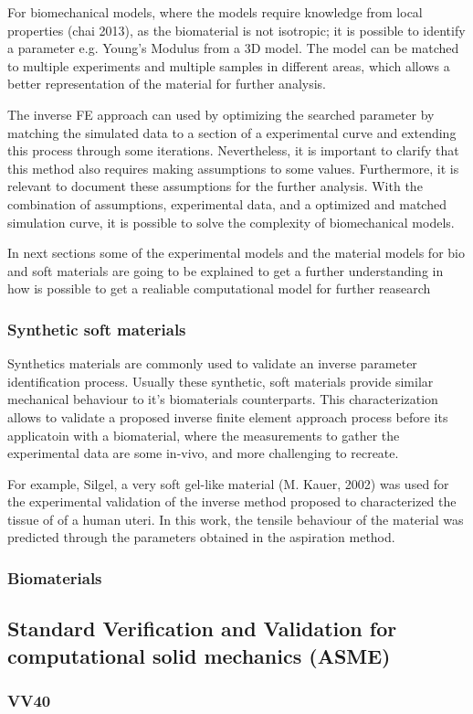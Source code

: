For biomechanical models, where the models require knowledge from local properties (chai 2013),
as the biomaterial is not isotropic; it is possible to identify a parameter e.g. Young's Modulus 
from a 3D model. The model can be matched to multiple experiments and multiple samples in different areas,
which allows a better representation of the material for further analysis.

The inverse FE approach can used by optimizing the searched parameter by matching the simulated data
to a section of a experimental curve and extending this process through some iterations. 
Nevertheless, it is important to clarify that this method also requires making assumptions to some values.
Furthermore, it is relevant to document these assumptions for the further analysis. 
With the combination of assumptions, experimental data, and a optimized and matched simulation curve, it
is possible to solve the complexity of biomechanical models.
 
In next sections some of the experimental models and the material models for bio and soft materials are 
going to be explained to get a further understanding in how is possible to get a realiable computational 
model for further reasearch

\subsubsection{Synthetic soft materials}

Synthetics materials are commonly used to validate an inverse parameter identification process. 
Usually these synthetic, soft materials provide similar mechanical behaviour to it's biomaterials 
counterparts. This characterization allows to validate a proposed inverse finite element approach process
before its applicatoin with a biomaterial, where the measurements to gather the experimental data are 
some in-vivo, and more challenging to recreate.

For example, Silgel, a very soft gel-like material (M. Kauer, 2002) was used for the experimental 
validation of the inverse method proposed to characterized the tissue of of a human uteri. In this 
work, the tensile behaviour of the material was predicted through the parameters obtained in the 
aspiration method. 
\subsubsection{Biomaterials}




\subsection{Standard Verification and Validation for computational solid mechanics (ASME)}
\subsubsection{VV40}


